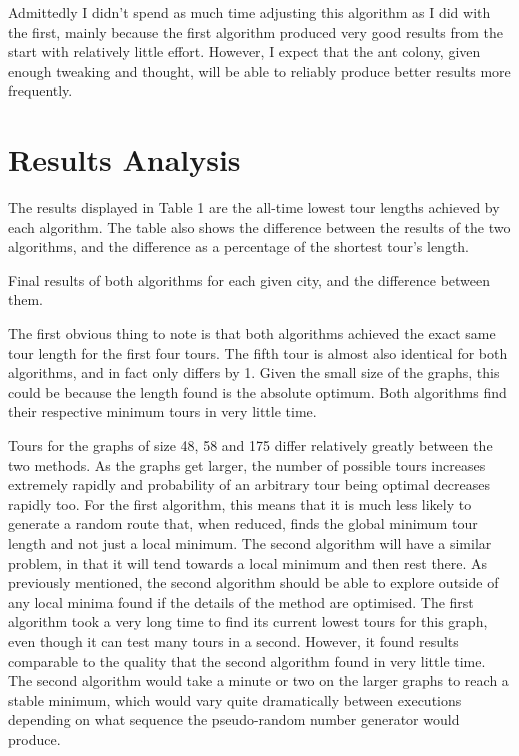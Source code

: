 \documentclass[a4paper,11pt]{article}
\begin{document}
Admittedly I didn't spend as much time adjusting this algorithm as I did with
the first, mainly because the first algorithm produced very good results from
the start with relatively little effort. However, I expect that the ant colony,
given enough tweaking and thought, will be able to reliably produce better
results more frequently.

\section{Results Analysis}
The results displayed in Table 1 are the all-time lowest tour lengths
achieved by each algorithm. The table also shows the difference between the
results of the two algorithms, and the difference as a percentage of the
shortest tour's length.

\begin{table}[h]
\begin{center}

\caption{Final results of both algorithms for each given city, and the
	difference between them.}
\end{center}
\end{table}

The first obvious thing to note is that both algorithms achieved the exact same
tour length for the first four tours. The fifth tour is almost also identical
for both algorithms, and in fact only differs by 1. Given the small size of the
graphs, this could be because the length found is the absolute optimum. Both 
algorithms find their respective minimum tours in very little time.

Tours for the graphs of size 48, 58 and 175 differ relatively greatly between
the two methods. As the graphs get larger, the number of possible tours
increases extremely rapidly and probability of an arbitrary tour being optimal
decreases rapidly too. For the first algorithm, this means that it is much less
likely to generate a random route that, when reduced, finds the global minimum
tour length and not just a local minimum. The second algorithm will have a
similar problem, in that it will tend towards a local minimum and then rest
there. As previously mentioned, the second algorithm should be able to explore
outside of any local minima found if the details of the method are optimised.
The first algorithm took a very long time to find its current lowest tours for
this graph, even though it can test many tours in a second. However, it found
results comparable to the quality that the second algorithm found in very
little time. The second algorithm would take a minute or two on the larger
graphs to reach a stable minimum, which would vary quite dramatically between
executions depending on what sequence the pseudo-random number generator would
produce.
\end{document}
